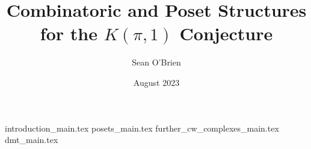 \documentclass[12pt]{article}
\title{Combinatoric and Poset Structures for the $K(\pi,1)$ Conjecture}
\author{Sean O'Brien}
\date{August 2023}
\begin{document}
\maketitle
{introduction_main.tex}
{posets_main.tex}
{further_cw_complexes_main.tex}
{dmt_main.tex}


\printbibliography
\end{document}
